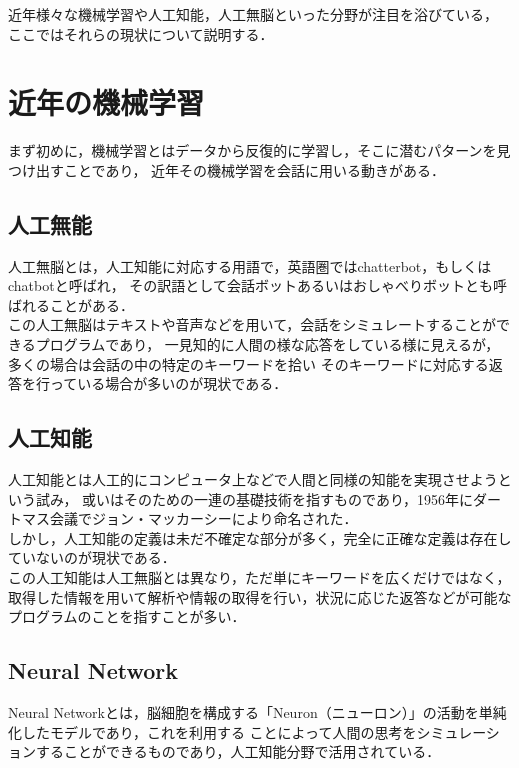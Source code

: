 近年様々な機械学習や人工知能，人工無脳といった分野が注目を浴びている，
ここではそれらの現状について説明する．

\section{近年の機械学習}
まず初めに，機械学習とはデータから反復的に学習し，そこに潜むパターンを見つけ出すことであり，
近年その機械学習を会話に用いる動きがある．
\\

\subsection{人工無能}
人工無脳\cite{muno}とは，人工知能に対応する用語で，英語圏ではchatterbot，もしくはchatbotと呼ばれ，
その訳語として会話ボットあるいはおしゃべりボットとも呼ばれることがある．
\\
この人工無脳はテキストや音声などを用いて，会話をシミュレートすることができるプログラムであり，
一見知的に人間の様な応答をしている様に見えるが，多くの場合は会話の中の特定のキーワードを拾い
そのキーワードに対応する返答を行っている場合が多いのが現状である．
\\

\subsection{人工知能}
人工知能\cite{tino}とは人工的にコンピュータ上などで人間と同様の知能を実現させようという試み，
或いはそのための一連の基礎技術を指すものであり，1956年にダートマス会議でジョン・マッカーシーにより命名された．
\\

しかし，人工知能の定義は未だ不確定な部分が多く，完全に正確な定義は存在していないのが現状である．
\\

この人工知能は人工無脳とは異なり，ただ単にキーワードを広くだけではなく，
取得した情報を用いて解析や情報の取得を行い，状況に応じた返答などが可能なプログラムのことを指すことが多い．
\\

\subsection{Neural Network}
Neural Networkとは，脳細胞を構成する「Neuron（ニューロン）」の活動を単純化したモデルであり，これを利用する
ことによって人間の思考をシミュレーションすることができるものであり，人工知能分野で活用されている．
\\

